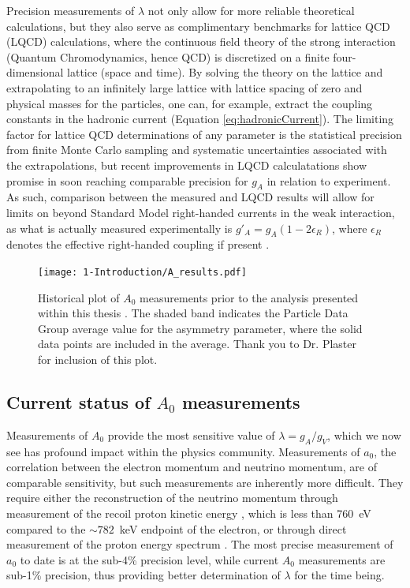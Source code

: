 Precision measurements of $\lambda$ not only allow for more reliable theoretical calculations, but
they also serve as complimentary benchmarks for lattice QCD (LQCD) calculations, where the continuous
field theory of the strong interaction (Quantum Chromodynamics, hence QCD)
is discretized on a finite four-dimensional lattice (space and time). By solving the theory on
the lattice and extrapolating to an infinitely large lattice with lattice spacing of zero 
and physical masses for the particles, one can, for example, extract the coupling constants in the
hadronic current (Equation \ref{eq:hadronicCurrent}). The limiting factor for lattice QCD
determinations of any parameter is the statistical precision from finite Monte Carlo sampling
and systematic uncertainties associated with the extrapolations, but recent improvements in
LQCD calculatations \cite{bhattacharya2016,capitani2017iso,berkowitz2017accurate,chang2017nucleon}
show promise in soon reaching comparable precision for $g_A$ in relation to
experiment. As such, comparison between the measured and LQCD results will allow for limits on
beyond Standard Model right-handed currents in the weak interaction, as what is actually measured experimentally
is $g'_A = g_A(1-2\epsilon_R)$, where $\epsilon_R$ denotes the effective right-handed coupling if present
\cite{cirigliano2013beta,gonzalez2016global,alioli2017right}.

\begin{figure} [h]
  \centering
  \texttt{[image: 1-Introduction/A\_results.pdf]}
  \caption{Historical plot of $A_0$ measurements prior to the analysis presented within
    this thesis
    \cite{bopp1986,erozolimskii1991new,yerozolimsky1997,liaud1997,abele2002,mund2013,mendenhall2013}.
    The shaded band indicates the Particle Data Group average value \cite{pdg}
    for the asymmetry parameter, where the solid data points are included in the average. Thank you
    to Dr. Plaster for inclusion of this plot.}
  \label{fig:Ameasurements}
\end{figure}


\subsection{Current status of $A_0$ measurements} \label{ssec:Previous_results}

Measurements of $A_0$ provide the most sensitive value of $\lambda = g_A/g_V$,
which we now see has profound impact within the physics community.
Measurements of $a_0$, the correlation between the electron momentum and
neutrino momentum, are of comparable sensitivity, but such measurements are inherently more difficult.
They require either the reconstruction of the neutrino momentum through measurement of the recoil proton
kinetic energy \cite{darius2017measurement}, which is less than 760~eV compared to the $\sim782$~keV endpoint
of the electron, or through direct measurement of
the proton energy spectrum \cite{byrne2002determination}. The most precise measurement of $a_0$ to date
is at the sub-4\% precision level, while current $A_0$ measurements are sub-1\% precision, thus providing
better determination of $\lambda$ for the time being.

